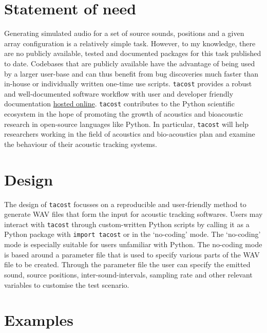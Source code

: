 \documentclass[
]{book}
\begin{document}
\hypertarget{statement-of-need}{%
\section{Statement of need}\label{statement-of-need}}

Generating simulated audio for a set of source sounds, positions and a given array configuration is a relatively simple task. However, to my knowledge, there are no publicly available, tested and documented packages for this task published to date. Codebases that are publicly available have the advantage of being used by a larger user-base and can thus benefit from bug discoveries much faster than in-house or individually written one-time use scripts. \texttt{tacost} provides a robust and well-documented software workflow \citep{Taschuk2016} with user and developer friendly documentation \href{https://tacost.readthedocs.io/en/latest/}{hosted online}. \texttt{tacost} contributes to the Python scientific ecosystem in the hope of promoting the growth of acoustics and bioacoustic research in open-source languages like Python. In particular, \texttt{tacost} will help researchers working in the field of acoustics and bio-acoustics \citep[eg.][]{deframond2020} plan and examine the behaviour of their acoustic tracking systems.

\hypertarget{design}{%
\section{Design}\label{design}}

The design of \texttt{tacost} focusses on a reproducible and user-friendly method \citep{Wilson2012} to generate WAV files that form the input for acoustic tracking softwares. Users may interact with \texttt{tacost} through custom-written Python scripts
by calling it as a Python package with \texttt{import\ tacost} or in the `no-coding' mode. The `no-coding' mode is especially suitable for users unfamiliar with Python. The no-coding mode is based around a parameter file that is used to specify various parts of the WAV file to be created.
Through the parameter file the user can specify the emitted sound, source positions, inter-sound-intervals, sampling rate and other relevant variables to customise the test scenario.

\hypertarget{examples}{%
\section{Examples}\label{examples}}
\end{document}

